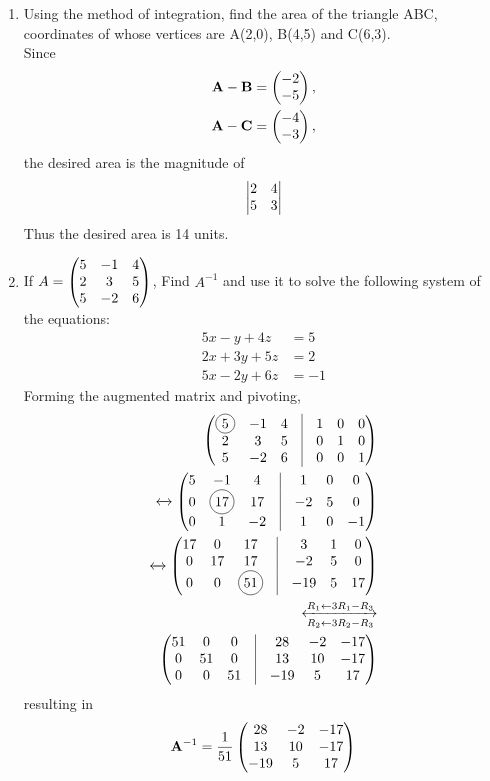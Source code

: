 \documentclass[journal,12pt,twocolumn]{IEEEtran}
\renewcommand\thesection{\arabic{section}}
\begin{document}
\begin{enumerate}[label=\thesection.\arabic*.,ref=\thesection.\theenumi]
    
\item Using the method of integration, find the area of the triangle ABC, coordinates of whose vertices are A(2,0), B(4,5) and C(6,3).\\
    \solution Since 
\begin{align}
	\mathbf{A}-\mathbf{B} &= \begin{pmatrix}-2 \\-5\end{pmatrix},
	\\
	\mathbf{A}-\mathbf{C} &= \begin{pmatrix}-4 \\-3\end{pmatrix},
    \end{align}
    the desired area is  the magnitude of 
\begin{align}
 \begin{vmatrix}2 & 4\\5 & 3\end{vmatrix} 
    \end{align}
    Thus the desired area is 14 units.
\item If $A=\begin{pmatrix}5 & -1 & 4 \\ 2 & 3 & 5 \\ 5 & -2 & 6\end{pmatrix} $, Find $A^{-1}$ and use it to solve the following system of the equations: \\
\begin{align}
	5x-y+4z &= 5 \nonumber \\
	2x+3y+5z &= 2 \nonumber \\
	5x-2y+6z &= -1 
\nonumber
\end{align}
   \solution Forming the augmented matrix and pivoting,  
\begin{align}
	\myvec{\circled{5} & -1 & 4 & \vrule & 1 & 0 & 0\\ 2 & 3 & 5 & \vrule & 0 & 1 & 0\\ 5 & -2 & 6 & \vrule & 0 & 0 & 1}
	\\
	\xleftrightarrow []{}
	\myvec{5 & -1 & 4 & \vrule & 1 & 0 & 0\\ 0 & \circled{17} & 17 & \vrule & -2 & 5 & 0\\ 0 & 1 & -2 & \vrule & 1 & 0 & -1}
	\\
	\xleftrightarrow []{}
	\myvec{17 & 0 & 17 & \vrule & 3 & 1 & 0\\ 0 & 17 & 17 & \vrule & -2 & 5 & 0\\ 0 & 0 & \circled{51} & \vrule & -19 & 5 & 17}
	\\
	\xleftrightarrow [R_2\leftarrow 3R_2 - R_3]{R_1\leftarrow 3R_1 - R_3}
	\\
	\myvec{51 & 0 & 0 & \vrule & 28 & -2& -17\\ 0 & 51 & 0 & \vrule & 13 & 10 & -17\\ 0 & 0 & 51 & \vrule & -19 & 5 & 17}
    \end{align}
    resulting in 
\begin{align}
	\mathbf{A}^{-1} = \frac{1}{51}\begin{pmatrix} 28 & -2 & -17\\  13 & 10 & -17\\  -19 & 5 & 17\end{pmatrix}
    \end{align}
    

\end{enumerate}
\end{document}
